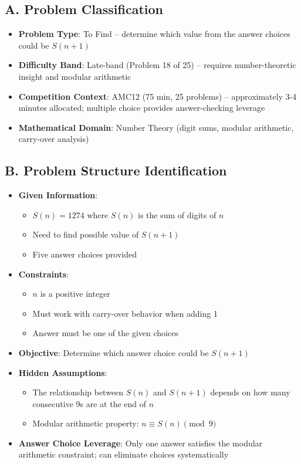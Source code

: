 \documentclass[]{article}
\begin{document}
\begin{problemconfigbox}
\subsection*{A. Problem Classification}
\begin{itemize}[leftmargin=*]
    \item \textbf{Problem Type}: To Find -- determine which value from the answer choices could be $S(n+1)$
    \item \textbf{Difficulty Band}: Late-band (Problem 18 of 25) -- requires number-theoretic insight and modular arithmetic
    \item \textbf{Competition Context}: AMC12 (75 min, 25 problems) -- approximately 3-4 minutes allocated; multiple choice provides answer-checking leverage
    \item \textbf{Mathematical Domain}: Number Theory (digit sums, modular arithmetic, carry-over analysis)
\end{itemize}

\subsection*{B. Problem Structure Identification}
\begin{itemize}[leftmargin=*]
    \item \textbf{Given Information}: 
    \begin{itemize}
        \item $S(n) = 1274$ where $S(n)$ is the sum of digits of $n$
        \item Need to find possible value of $S(n+1)$
        \item Five answer choices provided
    \end{itemize}
    \item \textbf{Constraints}: 
    \begin{itemize}
        \item $n$ is a positive integer
        \item Must work with carry-over behavior when adding 1
        \item Answer must be one of the given choices
    \end{itemize}
    \item \textbf{Objective}: Determine which answer choice could be $S(n+1)$
    \item \textbf{Hidden Assumptions}: 
    \begin{itemize}
        \item The relationship between $S(n)$ and $S(n+1)$ depends on how many consecutive 9s are at the end of $n$
        \item Modular arithmetic property: $n \equiv S(n) \pmod{9}$
    \end{itemize}
    \item \textbf{Answer Choice Leverage}: Only one answer satisfies the modular arithmetic constraint; can eliminate choices systematically
\end{itemize}


\end{problemconfigbox}
\end{document}
